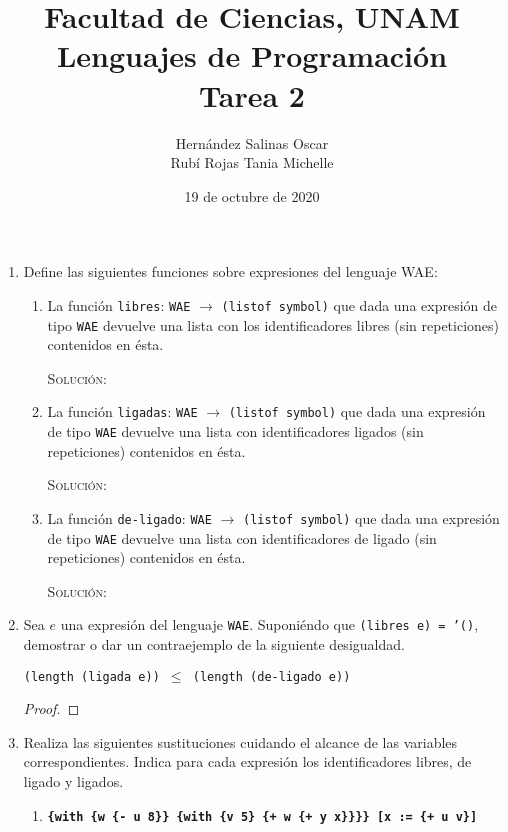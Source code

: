 \documentclass[letterpaper,11pt]{article}
\title{Facultad de Ciencias, UNAM \\ 
       Lenguajes de Programación \\ 
       Tarea 2}
\author{Hernández Salinas Oscar \\ 
        Rubí Rojas Tania Michelle }
\date{19 de octubre de 2020}
\begin{document}
\maketitle

\begin{enumerate}
    \item Define las siguientes funciones sobre expresiones del lenguaje WAE:
    \begin{enumerate}
        \item La función \texttt{libres}: \texttt{WAE} $\rightarrow$ 
        \texttt{(listof symbol)} que dada una expresión de tipo
        \texttt{WAE} devuelve una lista con los identificadores libres (sin 
        repeticiones) contenidos en ésta.

        \textsc{Solución:}

        \item La función \texttt{ligadas}: \texttt{WAE} $\rightarrow$
        \texttt{(listof symbol)} que dada una expresión de tipo
        \texttt{WAE} devuelve una lista con identificadores ligados (sin
        repeticiones) contenidos en ésta.

        \textsc{Solución:}

        \item La función \texttt{de-ligado}: \texttt{WAE} $\rightarrow$ 
        \texttt{(listof symbol)} que dada una expresión de tipo \texttt{WAE} 
        devuelve una lista con identificadores de ligado (sin repeticiones) 
        contenidos en ésta.

        \textsc{Solución:}
    \end{enumerate} 

    \item Sea $e$ una expresión del lenguaje \texttt{WAE}. Suponiéndo que 
    \texttt{(libres e) = '()}, demostrar o dar un contraejemplo de la siguiente 
    desigualdad.
    \begin{center}
        \texttt{(length (ligada e)) $\leq$ (length (de-ligado e))}
    \end{center}

    \begin{proof}
        
    \end{proof}

    \item Realiza las siguientes sustituciones cuidando el alcance de las 
    variables correspondientes. Indica para cada expresión los identificadores 
    libres, de ligado y ligados. 
    \begin{enumerate}
        \item \texttt{\textbf{\{with \{w \{- u 8\}\} \{with \{v 5\} 
        \{+ w \{+ y x\}\}\}\} {[}x := \{+ u v\}{]}}}


\end{enumerate}
\end{enumerate}
\end{document}

